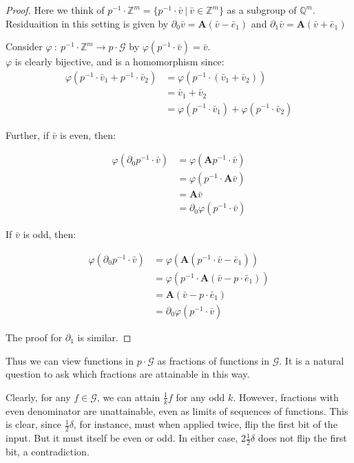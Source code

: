 \documentclass[12pt]{article}
\newcommand{\G}{\mathcal{G}}
\newcommand{\Z}{\mathbb{Z}}
\newcommand{\Q}{\mathbb{Q}}
\newcommand{\2}{\textbf{2}}
\newcommand{\Am}{\textbf{A}}
\newcommand{\del}{\partial}
\renewcommand{\v}{\bar{v}}
\newcommand{\e}{\bar{e}}
\begin{document}
\begin{proof}
  Here we think of $p^{-1} \cdot \Z^m = \{ p^{-1} \cdot \v~|~\v \in \Z^m \}$
  as a subgroup of $\Q^m$. Residuaition in this setting is given by
  $\del_0 \v = \Am (\v - \e_1)$ and $\del_1 \v = \Am (\v + \e_1)$ 

  Consider $\varphi~:~p^{-1} \cdot \Z^m \to p \cdot \G$ by
  $\varphi(p^{-1} \cdot \v) = \v$.\\
  $\varphi$ is clearly bijective, and is a homomorphism since:
  \begin{align*}
       \varphi(p^{-1} \cdot \v_1 + p^{-1} \cdot \v_2) 
    &= \varphi(p^{-1} \cdot (\v_1 + \v_2))\\
    &= \v_1 + \v_2\\
    &= \varphi(p^{-1} \cdot \v_1) + \varphi(p^{-1} \cdot \v_2) 
  \end{align*}

  Further, if $\v$ is even, then:

  \begin{align*}
       \varphi(\del_0 p^{-1} \cdot \v)
    &= \varphi(\Am p^{-1} \cdot \v)\\
    &= \varphi(p^{-1} \cdot \Am \v)\\
    &= \Am \v\\
    &= \del_0 \varphi(p^{-1} \cdot \v)
  \end{align*}

  If $\v$ is odd, then: 

  \begin{align*}
       \varphi(\del_0 p^{-1} \cdot \v)
    &= \varphi(\Am (p^{-1} \cdot \v - \e_1))\\
    &= \varphi(p^{-1} \cdot \Am (\v - p \cdot \e_1))\\
    &= \Am (\v - p \cdot \e_1)\\
    &= \del_0 \varphi(p^{-1} \cdot \v)
  \end{align*}

  The proof for $\del_1$ is similar.
\end{proof}

Thus we can view functions in $p \cdot \G$ as fractions of functions in $\G$.
It is a natural question to ask which fractions are attainable in this way.

Clearly, for any $f \in \G$, we can attain $\frac{1}{k} f$ for any odd $k$.
However, fractions with even denominator are unattainable, 
even as limits of sequences of functions.
This is clear, since $\frac{1}{2}\delta$, for instance, must 
when applied twice, flip the first bit of the input. But it must itself
be even or odd. In either case, $2 \frac{1}{2} \delta$ does not flip the 
first bit, a contradiction.
\end{document}
